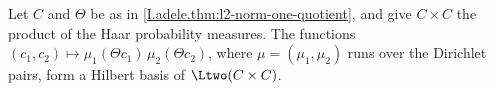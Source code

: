 Let $C$ and $\Theta$ be as in \cref{I.adele.thm:l2-norm-one-quotient}, and give $C\times C$ the product of the Haar
probability measures. The functions $(c_1,c_2)\mapsto\mu_1(\Theta c_1)\,\mu_2(\Theta c_2)$, where $\mu=(\mu_1,\mu_2)$
runs over the Dirichlet pairs, form a Hilbert basis of $\Ltwo(C\times C)$.
